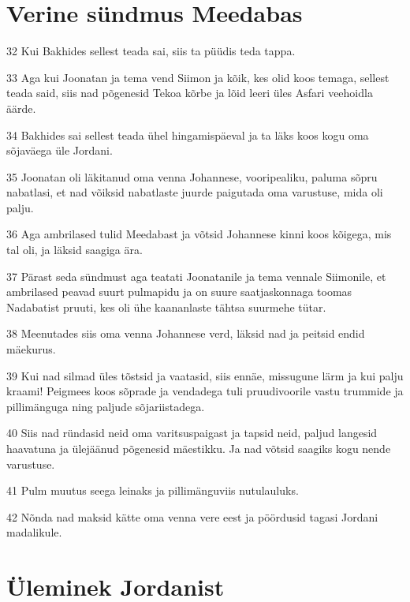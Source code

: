 \section*{Verine sündmus Meedabas}

\par 32 Kui Bakhides sellest teada sai, siis ta püüdis teda tappa.
\par 33 Aga kui Joonatan ja tema vend Siimon ja kõik, kes olid koos temaga, sellest teada said, siis nad põgenesid Tekoa kõrbe ja lõid leeri üles Asfari veehoidla äärde.
\par 34 Bakhides sai sellest teada ühel hingamispäeval ja ta läks koos kogu oma sõjaväega üle Jordani.
\par 35 Joonatan oli läkitanud oma venna Johannese, vooripealiku, paluma sõpru nabatlasi, et nad võiksid nabatlaste juurde paigutada oma varustuse, mida oli palju.
\par 36 Aga ambrilased tulid Meedabast ja võtsid Johannese kinni koos kõigega, mis tal oli, ja läksid saagiga ära.
\par 37 Pärast seda sündmust aga teatati Joonatanile ja tema vennale Siimonile, et ambrilased peavad suurt pulmapidu ja on suure saatjaskonnaga toomas Nadabatist pruuti, kes oli ühe kaananlaste tähtsa suurmehe tütar.
\par 38 Meenutades siis oma venna Johannese verd, läksid nad ja peitsid endid mäekurus.
\par 39 Kui nad silmad üles tõstsid ja vaatasid, siis ennäe, missugune lärm ja kui palju kraami! Peigmees koos sõprade ja vendadega tuli pruudivoorile vastu trummide ja pillimänguga ning paljude sõjariistadega.
\par 40 Siis nad ründasid neid oma varitsuspaigast ja tapsid neid, paljud langesid haavatuna ja ülejäänud põgenesid mäestikku. Ja nad võtsid saagiks kogu nende varustuse.
\par 41 Pulm muutus seega leinaks ja pillimänguviis nutulauluks.
\par 42 Nõnda nad maksid kätte oma venna vere eest ja pöördusid tagasi Jordani madalikule. 

\section*{Üleminek Jordanist}

